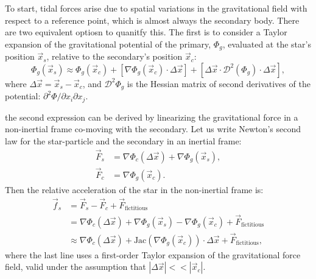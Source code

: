         To start, tidal forces arise due to spatial variations in the gravitational field with respect to a reference point, which is almost always the secondary body. There are two equivalent optiosn to quanitfy this. The first is to consider a Taylor expansion of the gravitational potential of the primary, \(\Phi_g\), evaluated at the star's position \(\vec{x}_s\), relative to the secondary's position \(\vec{x}_c\):
        \begin{equation}
            \Phi_g\left(\vec{x}_s\right) \approx \Phi_g\left(\vec{x}_c\right) + \left[\nabla \Phi_g (\vec{x}_c)\cdot \Delta \vec{x}\right] + \left[\Delta \vec{x} \cdot \mathcal{D}^2\left(\Phi_g\right) \cdot \Delta\vec{x}\right],
        \end{equation}
        where \(\Delta \vec{x} = \vec{x}_s - \vec{x}_c\), and \(\mathcal{D}^2 \Phi_g\) is the Hessian matrix of second derivatives of the potential: \(\partial^2 \Phi/\partial x_i \partial x_j\).

        the second expression can be derived by linearizing the gravitational force in a non-inertial frame co-moving with the secondary. Let us write Newton's second law for the star-particle and the secondary in an inertial frame:
        \begin{eqnarray}
            \vec{F}_s &= \nabla \Phi_c\left(\Delta \vec{x}\right) + \nabla \Phi_g\left(\vec{x}_s\right),\\
            \vec{F}_c &= \nabla \Phi_g\left(\vec{x}_c\right).
        \end{eqnarray}
        Then the relative acceleration of the star in the non-inertial frame is:
        \begin{eqnarray}
            \vec{f}_s &= \vec{F}_s - \vec{F}_c + \vec{F}_\mathrm{fictitious} \\
                    &= \nabla \Phi_c\left(\Delta \vec{x}\right) + \nabla \Phi_g\left(\vec{x}_s\right) - \nabla \Phi_g\left(\vec{x}_c\right) + \vec{F}_\mathrm{fictitious} \\
                    &\approx \nabla \Phi_c\left(\Delta \vec{x}\right) + \mathrm{Jac}\left(\nabla \Phi_g(\vec{x}_c)\right) \cdot \Delta \vec{x} + \vec{F}_\mathrm{fictitious},
        \end{eqnarray}
        where the last line uses a first-order Taylor expansion of the gravitational force field, valid under the assumption that \(|\Delta \vec{x}| << |\vec{x}_c|\). 

